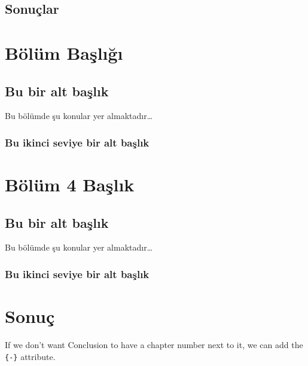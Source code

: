 \documentclass[12pt,twoside]{deuthesis}
\begin{document}
\hypertarget{sonuuxe7lar}{%
\section{Sonuçlar}\label{sonuuxe7lar}}

\hypertarget{Bolum4}{%
\chapter{Bölüm Başlığı}\label{Bolum4}}

\hypertarget{bu-bir-alt-baux15flux131k}{%
\section{Bu bir alt başlık}\label{bu-bir-alt-baux15flux131k}}

Bu bölümde şu konular yer almaktadır\ldots{}

\hypertarget{bu-ikinci-seviye-bir-alt-baux15flux131k}{%
\subsection{Bu ikinci seviye bir alt başlık}\label{bu-ikinci-seviye-bir-alt-baux15flux131k}}

\hypertarget{Bolum5}{%
\chapter{Bölüm 4 Başlık}\label{Bolum5}}

\hypertarget{bu-bir-alt-baux15flux131k-1}{%
\section{Bu bir alt başlık}\label{bu-bir-alt-baux15flux131k-1}}

Bu bölümde şu konular yer almaktadır\ldots{}

\hypertarget{bu-ikinci-seviye-bir-alt-baux15flux131k-1}{%
\subsection{Bu ikinci seviye bir alt başlık}\label{bu-ikinci-seviye-bir-alt-baux15flux131k-1}}

\hypertarget{sonuuxe7}{%
\chapter*{Sonuç}\label{sonuuxe7}}

If we don't want Conclusion to have a chapter number next to it, we can add the \texttt{\{-\}} attribute.
\end{document}
